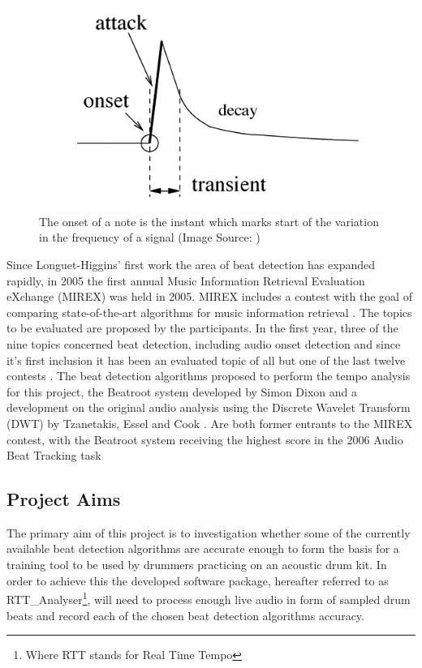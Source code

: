 \documentclass[a4paper, 11pt]{article}
\begin{document}
\begin{figure}[ht]
	\centering
	\includegraphics[scale=0.40]{Onset}
	\caption{The onset of a note is the instant which marks start of the variation in the frequency of a signal (Image Source: \cite{onset-tut})}
	\label{fig: Onset}
\end{figure}

Since Longuet-Higgins' first work the area of beat detection has expanded rapidly, in 2005 the first annual Music Information Retrieval Evaluation eXchange (MIREX) was held in 2005. MIREX includes a contest with the goal of comparing state-of-the-art algorithms for music information retrieval \cite{mirex-main}. The topics to be evaluated are proposed by the participants. In the first year, three of the nine topics concerned beat detection, including audio onset detection and since it's first inclusion it has been an evaluated topic of all but one of the last twelve contests \cite{mirex-onset}. The beat detection algorithms proposed to perform the tempo analysis for this project, the Beatroot system developed by Simon Dixon \cite{dixon1} and a development on the original audio analysis using the Discrete Wavelet Transform (DWT) by Tzanetakis, Essel and Cook \cite{tzane1}. Are both former entrants to the MIREX contest, with the Beatroot system receiving the highest score in the 2006 Audio Beat Tracking task \cite{mirex-06} 

\subsection{Project Aims}
The primary aim of this project is to investigation whether some of the currently available beat detection algorithms are accurate enough to form the basis for a training tool to be used by drummers practicing on an acoustic drum kit. In order to achieve this the developed software package, hereafter referred to as  RTT\_Analyser\footnote{Where RTT stands for Real Time Tempo}, will need to process enough live audio in form of sampled drum beats and record each of the chosen beat detection algorithms accuracy. 
\end{document}

